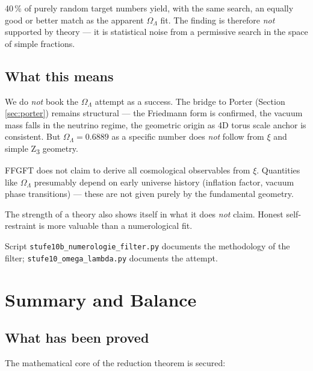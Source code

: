 \begin{important}
40\,\% of purely random target numbers yield, with the same search, an equally good or better match as the apparent \(\Omega_\Lambda\) fit. The finding is therefore \emph{not} supported by theory --- it is statistical noise from a permissive search in the space of simple fractions.
\end{important}

\subsection{What this means}

We do \emph{not} book the \(\Omega_\Lambda\) attempt as a success. The bridge to Porter (Section \ref{sec:porter}) remains structural --- the Friedmann form is confirmed, the vacuum mass falls in the neutrino regime, the geometric origin as 4D torus scale anchor is consistent. But \(\Omega_\Lambda = 0.6889\) as a specific number does \emph{not} follow from \(\xi\) and simple Z\textsubscript{3} geometry.

\begin{philosophical}
FFGFT does not claim to derive all cosmological observables from \(\xi\). Quantities like \(\Omega_\Lambda\) presumably depend on early universe history (inflation factor, vacuum phase transitions) --- these are not given purely by the fundamental geometry.

The strength of a theory also shows itself in what it does \emph{not} claim. Honest self-restraint is more valuable than a numerological fit.
\end{philosophical}

Script \texttt{stufe10b\_numerologie\_filter.py} documents the methodology of the filter; \texttt{stufe10\_omega\_lambda.py} documents the attempt.

\section{Summary and Balance}
\label{sec:bilanz}

\subsection{What has been proved}

The mathematical core of the reduction theorem is secured:

\begin{table}[h]
\centering
\caption{Mathematical core (Stages 1--3)}
\end{table}

